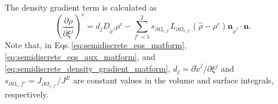 The density gradient term is calculated as  
\begin{equation}
\left(\dfrac{\partial \rho}{\partial \xi^j}\right)^e
= 
d_j  D_{\tilde{x}^j} \rho^e
- \sum_{f'=1}^2 s_{\partial \Omega_{e,f'}} L_{\partial \Omega_{e,f'}} \left( \widehat{\rho} - \rho^e \right)\bm{n}_{\tilde{x}^j}  \cdot \bm{n}.   
\label{eq:semidiscrete_density_gradient_matform}
\end{equation}
Note that, 
in Eqs.\,\eqref{eq:semidiscrete_eqs_matform}, \eqref{eq:semidiscrete_eqs_aux_matform}, and \eqref{eq:semidiscrete_density_gradient_matform}, 
$d_j=\partial \tilde{x}^j/\partial \xi^j$ 
and 
$s_{\partial \Omega_e,f'} =J_{\partial \Omega_{e,f'}}/J^E$ 
are constant values in the volume and surface integrals, respectively. 
